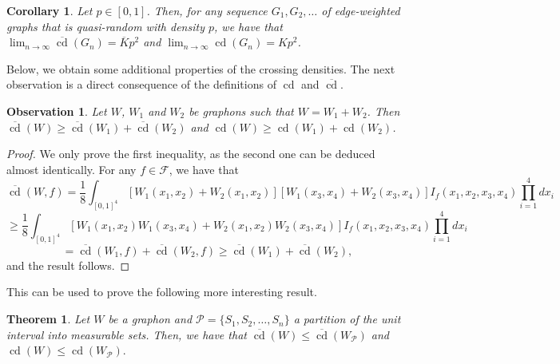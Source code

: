 \documentclass{article}
\newcounter{contSect} \numberwithin{contSect}{section}
\newtheorem{theorem}[contSect]{Theorem}
\newtheorem{corollary}[contSect]{Corollary}
\newtheorem{observation}[contSect]{Observation}
\begin{document}
\begin{corollary}
    Let $p\in[0,1]$. Then, for any sequence $G_1,G_2,\dots$ of edge-weighted graphs that is quasi-random with density $p$, we have that $\lim_{n\rightarrow\infty}\overline{\mathop{\mathrm{cd}}}(G_n)=\overline{K}p^2$ and $\lim_{n\rightarrow\infty}\mathop{\mathrm{cd}}(G_n)=Kp^2$.
\end{corollary}



Below, we obtain some additional properties of the crossing densities. The next observation is a direct consequence of the definitions of $\mathop{\mathrm{cd}}$ and $\overline{\mathop{\mathrm{cd}}}$.

\begin{observation}\label{teo:superaditive}
    Let $W$, $W_1$ and $W_2$ be graphons such that $W=W_1+W_2$. Then $\overline{\mathop{\mathrm{cd}}}(W)\geq\overline{\mathop{\mathrm{cd}}}(W_1)+\overline{\mathop{\mathrm{cd}}}(W_2)$ and $\mathop{\mathrm{cd}}(W)\geq\mathop{\mathrm{cd}}(W_1)+\mathop{\mathrm{cd}}(W_2)$.
\end{observation}

\begin{proof}
    We only prove the first inequality, as the second one can be deduced almost identically. For any $f\in\mathcal{F}$, we have that \[\overline{\mathop{\mathrm{cd}}}(W,f)=\frac{1}{8}\int_{[0,1]^4}[W_1(x_1,x_2)+W_2(x_1,x_2)][W_1(x_3,x_4)+W_2(x_3,x_4)]I_f(x_1,x_2,x_3,x_4)\prod_{i=1}^4 dx_i\]  
    \[\geq\frac{1}{8}\int_{[0,1]^4}[W_1(x_1,x_2)W_1(x_3,x_4)+W_2(x_1,x_2)W_2(x_3,x_4)]I_f(x_1,x_2,x_3,x_4)\prod_{i=1}^4 dx_i\] 
    \[=\overline{\mathop{\mathrm{cd}}}(W_1,f)+\overline{\mathop{\mathrm{cd}}}(W_2,f)\geq\overline{\mathop{\mathrm{cd}}}(W_1)+\overline{\mathop{\mathrm{cd}}}(W_2),\] and the result follows.
\end{proof}

This can be used to prove the following more interesting result.

\begin{theorem}
Let $W$ be a graphon and $\mathcal{P}=\{S_1,S_2,\dots,S_n\}$ a partition of the unit interval into measurable sets. Then, we have that $\overline{\mathop{\mathrm{cd}}}(W)\leq\overline{\mathop{\mathrm{cd}}}(W_\mathcal{P})$ and $\mathop{\mathrm{cd}}(W)\leq\mathop{\mathrm{cd}}(W_\mathcal{P}).$
\end{theorem}
\end{document}
